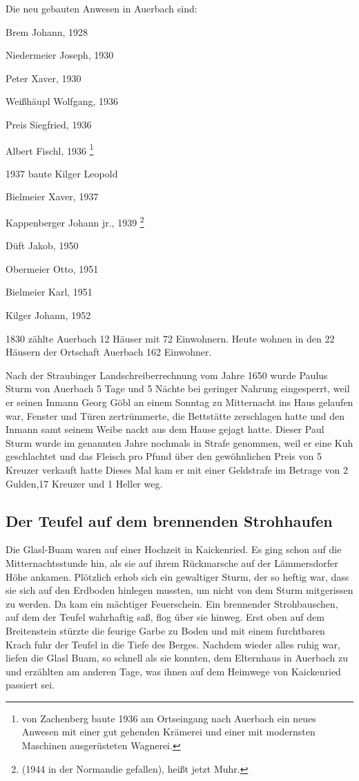 \documentclass{book}
\begin{document}
Die neu gebauten Anwesen in Auerbach sind:

\begin{compactitem}
\item Brem Johann, 1928
\item Niedermeier Joseph, 1930
\item Peter Xaver, 1930
\item Weißhäupl Wolfgang, 1936
\item Preis Siegfried, 1936
\item Albert Fischl, 1936 \footnote{von Zachenberg baute 1936 am Ortseingang nach
Auerbach ein neues Anwesen mit einer gut gehenden Krämerei und einer mit
modernsten Maschinen ausgerüsteten Wagnerei.}
\item 1937 baute Kilger Leopold
\item Bielmeier Xaver, 1937
\item Kappenberger Johann jr., 1939 \footnote{(1944 in der Normandie gefallen),
heißt jetzt Muhr.}
\item Düft Jakob, 1950
\item Obermeier Otto, 1951
\item Bielmeier Karl, 1951
\item Kilger Johann, 1952
\end{compactitem}

1830 zählte Auerbach 12 Häuser mit 72 Einwohnern. Heute wohnen in den 22 Häusern
der Ortschaft Auerbach 162 Einwohner.

Nach der Straubinger Landschreiberrechnung vom Jahre 1650 wurde Paulus Sturm von
Auerbach 5 Tage und 5 Nächte bei geringer Nahrung eingesperrt, weil er seinen
Inmann Georg Göbl an einem Sonntag zu Mitternacht ins Haus gelaufen war, Fenster
und Türen zertrümmerte, die Bettstätte zerschlagen hatte und den Inmann samt
seinem Weibe nackt aus dem Hause gejagt hatte. Dieser Paul Sturm wurde im
genannten Jahre nochmals in Strafe genommen, weil er eine Kuh geschlachtet und
das Fleisch pro Pfund über den gewöhnlichen Preis von 5 Kreuzer verkauft hatte
Dieses Mal kam er mit einer Geldstrafe im Betrage von 2 Gulden,17 Kreuzer und 1
Heller weg.

\subsection{Der Teufel auf dem brennenden Strohhaufen}

Die Glasl-Buam waren auf einer Hochzeit in Kaickenried. Es ging schon auf die
Mitternachtsstunde hin, als sie auf ihrem Rückmarsche auf der Lämmersdorfer Höhe
ankamen. Plötzlich erhob sich ein gewaltiger Sturm, der so heftig war, dass sie
sich auf den Erdboden hinlegen mussten, um nicht von dem Sturm mitgerissen zu
werden. Da kam ein mächtiger Feuerschein. Ein brennender Strohbauschen, auf dem
der Teufel wahrhaftig saß, flog über sie hinweg. Erst oben auf dem Breitenstein
stürzte die feurige Garbe zu Boden und mit einem furchtbaren Krach fuhr der
Teufel in die Tiefe des Berges. Nachdem wieder alles ruhig war, liefen die Glasl
Buam, so schnell als sie konnten, dem Elternhaus in Auerbach zu und erzählten am
anderen Tage, was ihnen auf dem Heimwege von Kaickenried passiert sei.
\end{document}

